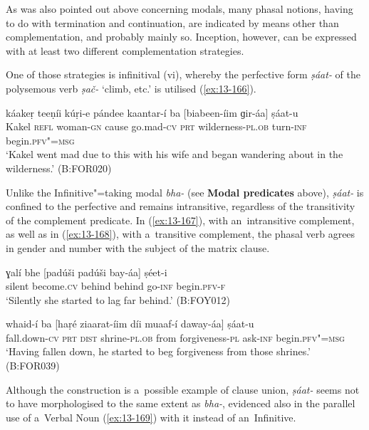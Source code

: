  As was also pointed out above concerning modals, many phasal notions, having to do with termination and continuation, are indicated by means other than complementation, and probably mainly so. Inception, however, can be expressed with at least two different complementation strategies.


One of those strategies is infinitival (vi), whereby the perfective form \textit{ṣáat-} of the polysemous verb \textit{ṣač-} `climb, etc.' is utilised (\ref{ex:13-166}). 

\begin{exe}
\ex
\label{ex:13-166}
\gll káakeṛ teeṇíi kúṛi-e pándee kaantar-í ba  [biabeen-íim ɡir-áa] ṣáat-u \\
Kakel \textsc{ refl} woman-\textsc{gn} cause go.mad-\textsc{cv} \textsc{prt}  wilderness-\textsc{pl.ob} turn-\textsc{inf} begin.\textsc{pfv"=msg} \\
\glt `Kakel went mad due to this with his wife and began wandering about in the wilderness.' (B:FOR020) 
\end{exe}

Unlike the Infinitive"=taking modal \textit{bha-} (see \textbf{Modal predicates} above), \textit{ṣáat-} is confined to the perfective and remains intransitive, regardless of the transitivity of the complement predicate. In (\ref{ex:13-167}), with an~intransitive complement, as well as in (\ref{ex:13-168}), with a~transitive complement, the phasal verb agrees in gender and number with the subject of the matrix clause.

\begin{exe}
\ex
\label{ex:13-167}
\gll ɣalí bhe [padúši padúši bay-áa] ṣéet-i  \\
silent become.\textsc{cv} behind behind go-\textsc{inf} begin.\textsc{pfv-f} \\
\glt `Silently she started to lag far behind.' (B:FOY012)

\ex
\label{ex:13-168}
\gll whaid-í ba [haṛé ziaarat-íim díi  muaaf-í daway-áa] ṣáat-u \\
fall.down-\textsc{cv} \textsc{prt} \textsc{dist} shrine-\textsc{pl.ob} from forgiveness-\textsc{pl} ask-\textsc{inf} begin.\textsc{pfv"=msg}  \\
\glt `Having fallen down, he started to beg forgiveness from those shrines.' (B:FOR039) 
\end{exe}

Although the construction is a~possible example of clause union, \textit{ṣáat-} seems not to have morphologised to the same extent as \textit{bha-}, evidenced also in the parallel use of a~Verbal Noun (\ref{ex:13-169}) with it instead of an~Infinitive. 

